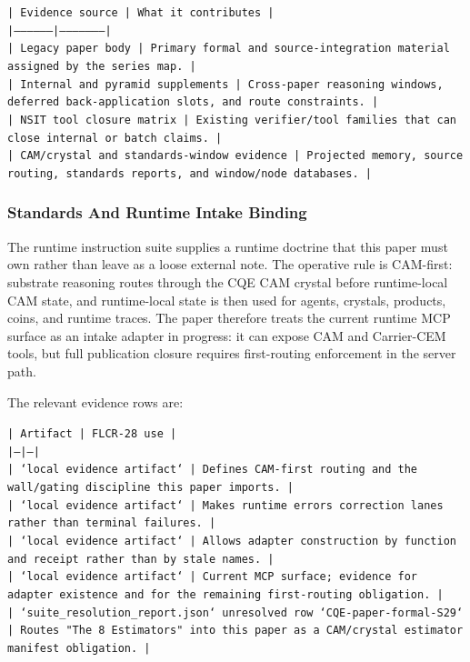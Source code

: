 \documentclass[11pt]{article}
\begin{document}
\noindent\texttt{| Evidence source | What it contributes |}\\
\noindent\texttt{|-----------------|---------------------|}\\
\noindent\texttt{| Legacy paper body | Primary formal and source-integration material assigned by the series map. |}\\
\noindent\texttt{| Internal and pyramid supplements | Cross-paper reasoning windows, deferred back-application slots, and route constraints. |}\\
\noindent\texttt{| NSIT tool closure matrix | Existing verifier/tool families that can close internal or batch claims. |}\\
\noindent\texttt{| CAM/crystal and standards-window evidence | Projected memory, source routing, standards reports, and window/node databases. |}\\

\subsubsection*{Standards And Runtime Intake Binding}

The runtime instruction suite supplies a runtime doctrine that this paper must
own rather than leave as a loose external note. The operative rule is CAM-first:
substrate reasoning routes through the CQE CAM crystal before runtime-local CAM
state, and runtime-local state is then used for agents, crystals, products,
coins, and runtime traces. The paper therefore treats the current runtime MCP
surface as an intake adapter in progress: it can expose CAM and Carrier-CEM
tools, but full publication closure requires first-routing enforcement in the
server path.

The relevant evidence rows are:

\noindent\texttt{| Artifact | FLCR-28 use |}\\
\noindent\texttt{|---|---|}\\
\noindent\texttt{| `local evidence artifact` | Defines CAM-first routing and the wall/gating discipline this paper imports. |}\\
\noindent\texttt{| `local evidence artifact` | Makes runtime errors correction lanes rather than terminal failures. |}\\
\noindent\texttt{| `local evidence artifact` | Allows adapter construction by function and receipt rather than by stale names. |}\\
\noindent\texttt{| `local evidence artifact` | Current MCP surface; evidence for adapter existence and for the remaining first-routing obligation. |}\\
\noindent\texttt{| `suite\_resolution\_report.json` unresolved row `CQE-paper-formal-S29` | Routes "The 8 Estimators" into this paper as a CAM/crystal estimator manifest obligation. |}\\
\end{document}
